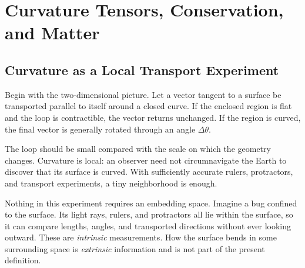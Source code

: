 \chapter{Curvature Tensors, Conservation, and Matter}


\section{Curvature as a Local Transport Experiment}

Begin with the two-dimensional picture. Let a vector tangent to a surface
be transported parallel to itself around a closed curve. If the enclosed
region is flat and the loop is contractible, the vector returns unchanged.
If the region is curved, the final vector is generally rotated through an
angle \(\Delta\theta\).

The loop should be small compared with the scale on which the geometry
changes. Curvature is local: an observer need not circumnavigate the Earth
to discover that its surface is curved. With sufficiently accurate rulers,
protractors, and transport experiments, a tiny neighborhood is enough.

\begin{classroomqa}
\end{classroomqa}

Nothing in this experiment requires an embedding space. Imagine a bug
confined to the surface. Its light rays, rulers, and protractors all lie
within the surface, so it can compare lengths, angles, and transported
directions without ever looking outward. These are \emph{intrinsic}
measurements. How the surface bends in some surrounding space is
\emph{extrinsic} information and is not part of the present definition.

